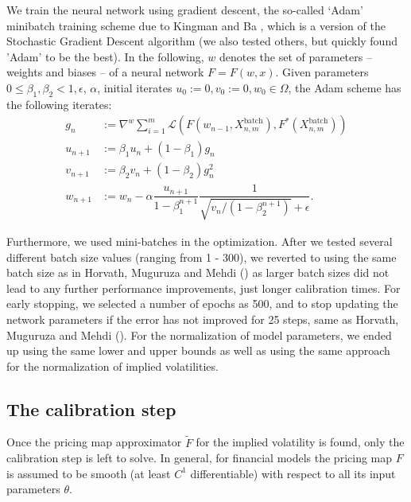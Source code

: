 \documentclass{article}
\theoremstyle{remark}
\begin{document}
We train the neural network using gradient descent,
the so-called `Adam' minibatch training scheme due to Kingman and Ba \cite{KBAdam},
which is a version of the Stochastic Gradient Descent algorithm (we also tested others, but quickly found 'Adam' to be the best).
In the following, $w$ denotes the set of parameters --
weights and biases -- of a neural network $F = F(w,x)$.  Given parameters
$0 \leq \beta_{1}, \beta_{2} < 1, \epsilon$, $\alpha$, initial iterates
$u_{0} := 0, v_{0} := 0, w_{0}\in\Omega$, the Adam scheme has the following
iterates:
\begin{align*}
  g_{n} &  := \nabla^{w} \sum_{i = 1}^{m}
          \mathcal{L}\left(F(w_{n-1},X_{n,m}^{\text{batch}}),F^*(X_{n,m}^{\text{batch}})\right)\\ 
  u_{n+1} & := \beta_{1} u_{n} + (1 - \beta_{1})g_{n} \\
  v_{n+1} & := \beta_{2} v_{n} + (1 - \beta_{2}) g_{n}^{2} \\
  w_{n+1} & := w_{n} - \alpha \dfrac{u_{n+1}}{1 - \beta_{1}^{n+1}} \dfrac{1}{\sqrt{v_{n} / (1 - \beta_{2}^{n+1})} + \epsilon}.
\end{align*}

Furthermore, we used mini-batches in the optimization. After we tested several different batch size values (ranging from 1 - 300),
we reverted to using the same batch size as in Horvath, Muguruza and Mehdi (\cite{HMM19}) as larger batch sizes did not lead to
any further performance improvements, just longer calibration times.
For early stopping, we selected a number of epochs as 500, and to stop updating the network parameters
if the error has not improved for 25 steps, same as Horvath, Muguruza and Mehdi (\cite{HMM19}).
For the normalization of model parameters, we ended up using the same lower and upper bounds as well as using the same approach
for the normalization of implied volatilities.

\subsection{The calibration step}
\label{sec:calibrationStep}

Once the pricing map approximator $\widetilde{F}$  for the implied volatility
is found, only the calibration step is left to solve.
In general, for financial models the pricing map $F$ is assumed to be smooth
(at least $C^1$ differentiable) with respect to all its input parameters $\theta$.
\end{document}
